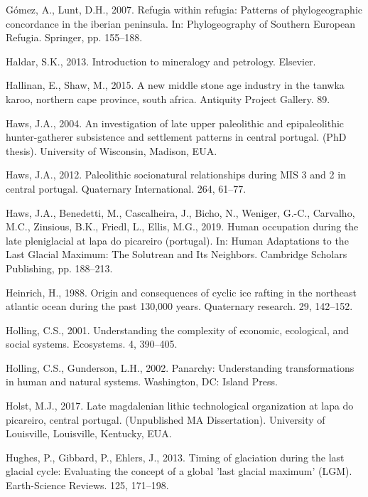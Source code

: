 \documentclass[12pt,twoside]{reedthesis}
\begin{document}
\leavevmode\hypertarget{ref-gomez2007}{}%
Gómez, A., Lunt, D.H., 2007. Refugia within refugia: Patterns of phylogeographic concordance in the iberian peninsula. In: Phylogeography of Southern European Refugia. Springer, pp. 155--188.

\leavevmode\hypertarget{ref-haldar2013}{}%
Haldar, S.K., 2013. Introduction to mineralogy and petrology. Elsevier.

\leavevmode\hypertarget{ref-hallinan2015}{}%
Hallinan, E., Shaw, M., 2015. A new middle stone age industry in the tanwka karoo, northern cape province, south africa. Antiquity Project Gallery. 89.

\leavevmode\hypertarget{ref-haws2004}{}%
Haws, J.A., 2004. An investigation of late upper paleolithic and epipaleolithic hunter-gatherer subsistence and settlement patterns in central portugal. (PhD thesis). University of Wisconsin, Madison, EUA.

\leavevmode\hypertarget{ref-haws2012}{}%
Haws, J.A., 2012. Paleolithic socionatural relationships during MIS 3 and 2 in central portugal. Quaternary International. 264, 61--77.

\leavevmode\hypertarget{ref-hawsetal2019}{}%
Haws, J.A., Benedetti, M., Cascalheira, J., Bicho, N., Weniger, G.-C., Carvalho, M.C., Zinsious, B.K., Friedl, L., Ellis, M.G., 2019. Human occupation during the late pleniglacial at lapa do picareiro (portugal). In: Human Adaptations to the Last Glacial Maximum: The Solutrean and Its Neighbors. Cambridge Scholars Publishing, pp. 188--213.

\leavevmode\hypertarget{ref-heinrich1988}{}%
Heinrich, H., 1988. Origin and consequences of cyclic ice rafting in the northeast atlantic ocean during the past 130,000 years. Quaternary research. 29, 142--152.

\leavevmode\hypertarget{ref-holling2001}{}%
Holling, C.S., 2001. Understanding the complexity of economic, ecological, and social systems. Ecosystems. 4, 390--405.

\leavevmode\hypertarget{ref-holling2002}{}%
Holling, C.S., Gunderson, L.H., 2002. Panarchy: Understanding transformations in human and natural systems. Washington, DC: Island Press.

\leavevmode\hypertarget{ref-holst2017}{}%
Holst, M.J., 2017. Late magdalenian lithic technological organization at lapa do picareiro, central portugal. (Unpublished MA Dissertation). University of Louisville, Louisville, Kentucky, EUA.

\leavevmode\hypertarget{ref-hughes2013}{}%
Hughes, P., Gibbard, P., Ehlers, J., 2013. Timing of glaciation during the last glacial cycle: Evaluating the concept of a global 'last glacial maximum' (LGM). Earth-Science Reviews. 125, 171--198.
\end{document}
